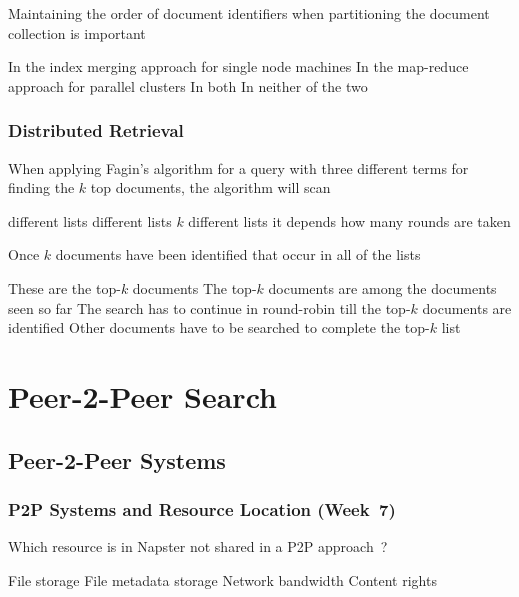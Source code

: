 \documentclass[12pt,a4paper,answers]{exam} %
\begin{document}
\begin{flushleft}
\begin{multicols*}{2}
\begin{questions}
\question Maintaining the order of document identifiers when partitioning the document collection is important
\begin{checkboxes}
\CorrectChoice In the index merging approach for single node machines
\choice In the map-reduce approach for parallel clusters
\choice In both
\choice In neither of the two
\end{checkboxes}


\subsubsection{Distributed Retrieval}

\question When applying Fagin’s algorithm for a query with three different terms for finding the $k$ top documents, the algorithm will scan
\begin{checkboxes}
 different lists
 different lists
\choice $k$ different lists
\choice it depends how many rounds are taken
\end{checkboxes}

\question Once $k$ documents have been identified that occur in all of the lists
\begin{checkboxes}
\choice These are the top-$k$ documents
\CorrectChoice The top-$k$ documents are among the documents seen so far
\choice The search has to continue in round-robin till the top-$k$ documents are identified
\choice Other documents have to be searched to complete the top-$k$ list
\end{checkboxes}


\section{Peer-2-Peer Search}
\subsection{Peer-2-Peer Systems}
\subsubsection{P2P Systems and Resource Location (Week~7)}

\question Which resource is in Napster not shared in a P2P approach~?
\begin{checkboxes}
\choice File storage
\CorrectChoice File metadata storage
\choice Network bandwidth
\choice Content rights
\end{checkboxes}


\end{questions}
\end{multicols*}
\end{flushleft}
\end{document}
